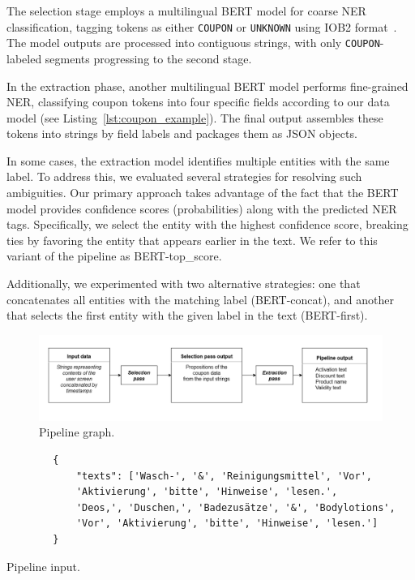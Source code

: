 \documentclass[licencjacka,en]{pracamgr}
\begin{document}
The selection stage employs a multilingual BERT model for coarse NER classification, tagging tokens as either \texttt{COUPON} or \texttt{UNKNOWN} using IOB2 format~\cite{iob2}. The model outputs are processed into contiguous strings, with only \texttt{COUPON}-labeled segments progressing to the second stage.

In the extraction phase, another multilingual BERT model performs fine-grained NER, classifying coupon tokens into four specific fields according to our data model (see Listing~\ref{lst:coupon_example}). The final output assembles these tokens into strings by field labels and packages them as JSON objects.

In some cases, the extraction model identifies multiple entities with the same label. To address this, we evaluated several strategies for resolving such ambiguities. Our primary approach takes advantage of the fact that the BERT model provides confidence scores (probabilities) along with the predicted NER tags. Specifically, we select the entity with the highest confidence score, breaking ties by favoring the entity that appears earlier in the text. We refer to this variant of the pipeline as BERT-top\_score.

Additionally, we experimented with two alternative strategies: one that concatenates all entities with the matching label (BERT-concat), and another that selects the first entity with the given label in the text (BERT-first).

\begin{figure}
    \centering
    \includegraphics[width=1.0\linewidth]{bachelor_images/zpp.png}
    \caption{Pipeline graph.}
    \label{fig:zpp}
\end{figure}

\begin{center}
   \begin{listing}
        \begin{verbatim}
        {
            "texts": ['Wasch-', '&', 'Reinigungsmittel', 'Vor',
            'Aktivierung', 'bitte', 'Hinweise', 'lesen.',
            'Deos,', 'Duschen,', 'Badezusätze', '&', 'Bodylotions',
            'Vor', 'Aktivierung', 'bitte', 'Hinweise', 'lesen.']
        }
        \end{verbatim}
        \caption{Pipeline input.}
        \label{list:sel-input}
    \end{listing}
\end{center}
\end{document}
